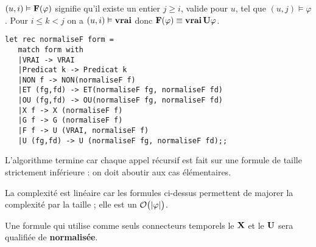 \begin{Answer}
$(u,i) \vDash {\bf F}(\varphi)$ signifie qu'il existe un entier $j\ge i$, valide pour $u$, tel que $(u,j) \vDash \varphi$.
Pour $i\le k < j$ on a $(u,i) \vDash{\bf vrai}$ donc ${\bf F}(\varphi) \equiv {\bf vrai}\,{\bf U}\varphi$.

\begin{lstlisting}
let rec normaliseF form = 
   match form with 
   |VRAI -> VRAI
   |Predicat k -> Predicat k
   |NON f -> NON(normaliseF f)
   |ET (fg,fd) -> ET(normaliseF fg, normaliseF fd)
   |OU (fg,fd) -> OU(normaliseF fg, normaliseF fd)
   |X f -> X (normaliseF f)
   |G f -> G (normaliseF f)
   |F f -> U (VRAI, normaliseF f)
   |U (fg,fd) -> U (normaliseF fg, normaliseF fd);;
\end{lstlisting} 

L'algorithme termine car chaque appel récursif est fait sur une formule de taille strictement inférieure : on doit aboutir aux cas élémentaires.

La complexité est linéaire car les formules ci-dessus permettent de majorer la complexité par la taille ; elle est un ${\cal O}\bigl(|\varphi|\bigr)$.
\end{Answer}

\medskip

Une formule qui utilise comme seuls connecteurs temporels le ${\bf X}$ et le ${\bf U}$ sera qualifiée de {\bf normalisée}.

